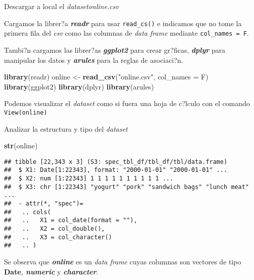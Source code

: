 \documentclass[
  ignorenonframetext,
]{beamer}
\newenvironment{Shaded}{\begin{snugshade}}{\end{snugshade}}
\newcommand{\DataTypeTok}[1]{\textcolor[rgb]{0.13,0.29,0.53}{#1}}
\newcommand{\KeywordTok}[1]{\textcolor[rgb]{0.13,0.29,0.53}{\textbf{#1}}}
\newcommand{\NormalTok}[1]{#1}
\newcommand{\StringTok}[1]{\textcolor[rgb]{0.31,0.60,0.02}{#1}}
\begin{document}
\begin{frame}[fragile]{Descargar a local el \emph{datasetonline.csv}}
\protect\hypertarget{descargar-a-local-el-datasetonline.csv}{}

Cargamos la librer?a \textbf{\emph{readr}} para usar \texttt{read\_cs()}
e indicamos que no tome la primera fila del \emph{csv} como las columnas
de \emph{data frame} mediante \texttt{col\_names\ =\ F}.

Tambi?n cargamos las librer?as \textbf{\emph{ggplot2}} para crear
gr?ficas, \textbf{\emph{dplyr}} para manipular los datos y
\textbf{\emph{arules}} para la reglas de asociaci?n.

\begin{Shaded}
\begin{Highlighting}[]
\KeywordTok{library}\NormalTok{(readr)}
\NormalTok{online <-}\StringTok{ }\KeywordTok{read_csv}\NormalTok{(}\StringTok{"online.csv"}\NormalTok{, }\DataTypeTok{col_names =}\NormalTok{ F)}
\KeywordTok{library}\NormalTok{(ggplot2)}
\KeywordTok{library}\NormalTok{(dplyr)}
\KeywordTok{library}\NormalTok{(arules)}
\end{Highlighting}
\end{Shaded}

Podemos visualizar el \emph{dataset} como si fuera una hoja de c?lculo
con el comando \texttt{View(online)}

\end{frame}

\begin{frame}[fragile]{Analizar la estructura y tipo del \emph{dataset}}
\protect\hypertarget{analizar-la-estructura-y-tipo-del-dataset}{}

\begin{Shaded}
\begin{Highlighting}[]
\KeywordTok{str}\NormalTok{(online)}
\end{Highlighting}
\end{Shaded}

\begin{verbatim}
## tibble [22,343 x 3] (S3: spec_tbl_df/tbl_df/tbl/data.frame)
##  $ X1: Date[1:22343], format: "2000-01-01" "2000-01-01" ...
##  $ X2: num [1:22343] 1 1 1 1 1 1 1 1 1 1 ...
##  $ X3: chr [1:22343] "yogurt" "pork" "sandwich bags" "lunch meat" ...
##  - attr(*, "spec")=
##   .. cols(
##   ..   X1 = col_date(format = ""),
##   ..   X2 = col_double(),
##   ..   X3 = col_character()
##   .. )
\end{verbatim}

Se observa que \textbf{\emph{online}} es un \emph{data frame} cuyas
columnas son vectores de tipo \textbf{Date}\emph{, \textbf{numeric}} y
\textbf{\emph{character}}.

\end{frame}
\end{document}
